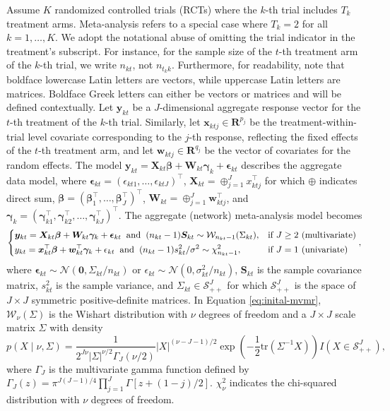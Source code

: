 Assume $K$ randomized controlled trials (RCTs) where the $k$-th trial includes $T_k$ treatment arms. Meta-analysis refers to a special case where $T_k=2$ for all $k=1,\ldots,K$. We adopt the notational abuse of omitting the trial indicator in the treatment's subscript. For instance, for the sample size of the $t$-th treatment arm of the $k$-th trial, we write $n_{kt}$, not $n_{t_kk}$. {\color{black}Furthermore, for readability, note that boldface lowercase Latin letters are vectors, while uppercase Latin letters are matrices. Boldface Greek letters can either be vectors or matrices and will be defined contextually.} Let $\bm{y}_{kt}$ be a $J$-dimensional aggregate response vector for the $t$-th treatment of the $k$-th trial. Similarly, let $\boldsymbol{x}_{ktj}\in \mathbf{R}^{p_j}$ be the treatment-within-trial level covariate corresponding to the $j$-th response, reflecting the fixed effects of the $t$-th treatment arm, and let $\boldsymbol{w}_{ktj} \in \mathbf{R}^{q_j}$ be the vector of covariates for the random effects. The model $\boldsymbol{y}_{kt}=\boldsymbol{X}_{kt}\boldsymbol{\beta} + \boldsymbol{W}_{kt} \boldsymbol{\gamma}_k + \boldsymbol{\epsilon}_{kt}$ describes the aggregate data model, where $\boldsymbol{\epsilon}_{kt} = (\epsilon_{kt1},\ldots,\epsilon_{ktJ})^\top$, $\boldsymbol{X}_{kt} = \oplus_{j=1}^J x_{ktj}^\top$ for which $\oplus$ indicates direct sum, $\boldsymbol{\beta} = (\boldsymbol{\beta}_1^\top,\ldots,\boldsymbol{\beta}_J^\top)^\top$, $\boldsymbol{W}_{kt}=\oplus_{j=1}^J \boldsymbol{w}_{ktj}^\top$, and $\boldsymbol{\gamma}_k = (\boldsymbol{\gamma}_{k1}^\top,\boldsymbol{\gamma}_{k2}^\top,\ldots,\boldsymbol{\gamma}_{kJ}^\top)^\top$. The aggregate (network) meta-analysis model becomes
\begin{equation}\label{eq:inital-mvmr}
\begin{dcases}
  \bm{y}_{kt} = \bm{X}_{kt}\bm{\beta} + \bm{W}_{kt} \bm{\gamma}_k + \bm{\epsilon}_{kt} \;\; \mbox{and} \;\; (n_{kt}-1)\bm{S}_{kt} \sim
  \mathcal{W}_{n_{kt}-1}(\Sigma_{kt}),&\text{if $J\geq 2$ (multivariate)}\\
  y_{kt} = \bm{x}_{kt}^\top\bm{\beta} + \bm{w}_{kt}^\top \bm{\gamma}_k + \epsilon_{kt} \;\; \mbox{and} \;\; (n_{kt}-1)s^2_{kt}/\sigma^2 \sim \chi^2_{n_{kt}-1},&\text{if $J=1$ (univariate)}
\end{dcases},
\end{equation}
 where $\bm{\epsilon}_{kt} \sim \mathcal{N}(\bm{0}, \Sigma_{kt}/n_{kt})$ or $\epsilon_{kt} \sim \mathcal{N}(0,\sigma_{kt}^2/n_{kt})$, $\bm{S}_{kt}$ is the sample covariance matrix, $s_{kt}^2$ is the sample variance, and $\Sigma_{kt} \in \mathcal{S}_{++}^J$ for which $\mathcal{S}_{++}^J$ is the space of $J\times J$ symmetric positive-definite matrices. In Equation \eqref{eq:inital-mvmr},  $\mathcal{W}_{\nu}(\Sigma)$ is the Wishart distribution
with $\nu$ degrees of freedom and a $J\times J$ scale matrix $\Sigma$ with density
\[
  p(X\mid \nu, \Sigma) = \dfrac{1}{2^{J\nu}|\Sigma|^{\nu/2}\Gamma_J(\nu/2)} |X|^{(\nu-J-1)/2}\exp\left(-\dfrac{1}{2}\mathrm{tr}(\Sigma^{-1}X) \right)I(X\in \mathcal{S}_{++}^J),
\]
where $\Gamma_J$ is the multivariate gamma function defined by \(\Gamma_J(z) = \pi^{J(J-1)/4}\prod_{j=1}^J \Gamma[z+(1-j)/2]\). $\chi_\nu^2$ indicates the chi-squared distribution with $\nu$ degrees of freedom. 

